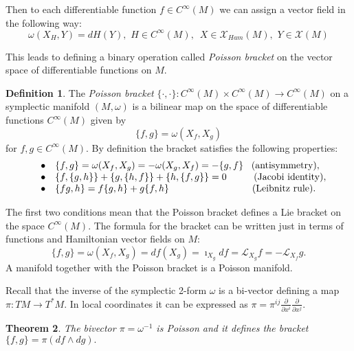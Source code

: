 \documentclass[11pt]{report}
\theoremstyle{plain}
\newtheorem{thm}{Theorem}[section]
\theoremstyle{definition}
\newtheorem{defn}[thm]{Definition}
\theoremstyle{remark}
\theoremstyle{remark}
\numberwithin{equation}{section}
\begin{document}
Then to each differentiable function $f \in C^\infty(M)$ we can assign a vector field in the following way:
\begin{equation}
\omega(X_H, Y) = dH(Y), \, \, H\in C^\infty(M), \, \, \, X \in \mathcal{X}_{Ham}(M), \,\, Y \in \mathcal{X}(M)
\end{equation}

This leads to defining a binary operation called \textit{Poisson bracket} on the vector space of differentiable functions on $M$. 

\begin{defn}
The \textit{Poisson bracket} $\{\cdot, \cdot \}: C^\infty(M)\times C^\infty(M) \to C^\infty(M)$ on a symplectic manifold $(M,\omega)$ is a bilinear map on the space of differentiable functions $C^\infty(M)$ given by 
\begin{equation}
\{ f, g \} = \omega(X_f, X_g)
\end{equation}
for $f, g \in C^\infty(M)$. By definition the bracket satisfies the following properties:
\[\begin{array}{lcl}
 &\bullet& \{ f, g \} = \omega(X_f, X_g) = -\omega(X_g, X_f) = -\{ g, f \} \, \, \, \,\, {\rm (antisymmetry)},\\
 &\bullet& \{ f, \{g,h\} \} + \{ g, \{h,f\} \} + \{ h, \{f,g\} \} = 0 \,\,\,\,\, \,\,\, \, \, \,  \, \, \, \, \, \, {\rm (Jacobi \, \, identity)},\\
 &\bullet& \{ fg, h \} = f \{ g, h \} + g\{ f, h \}  \, \, \, \, \, \, \,\,\, \, \,  \, \, \, \, \, \, \, \,  \, \, \, \, \, \, \, \, \, \, \, \, \, \, \, \, \, \, \, \, \, \, \, \, \, \, \, \, \,  \, \, \, \,{\rm (Leibnitz \, \, rule)}.\\
\end{array}\]
\end{defn}

The first two conditions mean that the Poisson bracket defines a Lie bracket on the space $C^\infty(M)$. 
The formula for the bracket can be written just in terms of functions and Hamiltonian vector fields on $M$:
$$
\{ f, g \} = \omega(X_f, X_g) = df(X_g) = \imath_{X_g}df = \mathcal{L}_{X_g}f = - \mathcal{L}_{X_f}g.
$$
A manifold together with the Poisson bracket is a Poisson manifold.

Recall that the inverse of the symplectic 2-form $\omega$ is a bi-vector defining a map $\pi: TM \to T^*M$. In local coordinates it can be expressed as $\pi = \pi^{ij}\frac{\partial}{\partial x^i}\frac{\partial}{\partial x^j}$.
 
 
 \begin{thm}
 The bivector $\pi=\omega^{-1}$ is Poisson and it defines the bracket $\{ f, g \} = \pi (df \wedge dg).$
 \end{thm}
 
\end{document}
